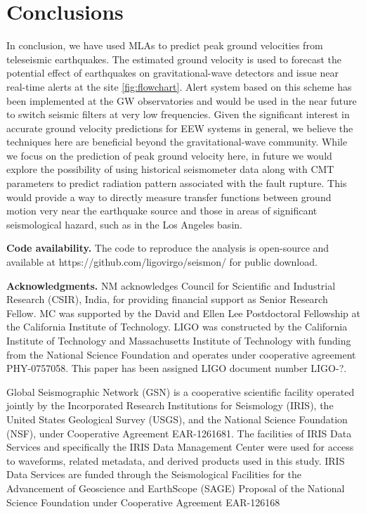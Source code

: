 \documentclass[twocolumn, aps, superscriptaddress]{revtex4}
\begin{document}
\section{Conclusions}
\label{sec:conclusion}
In conclusion, we have used MLAs to predict peak ground velocities from teleseismic earthquakes. The estimated ground velocity is used to forecast the potential effect of earthquakes on gravitational-wave detectors and issue near real-time alerts at the site \ref{fig:flowchart}. Alert system based on this scheme has been implemented at the GW observatories and would be used in the near future to switch seismic filters at very low frequencies. Given the significant interest in accurate ground velocity predictions for EEW systems in general, we believe the techniques here are beneficial beyond the gravitational-wave community.
While we focus on the prediction of peak ground velocity here, in future we would explore the possibility of using historical seismometer data along with CMT parameters to predict radiation pattern associated with the fault rupture.
This would provide a way to directly measure transfer functions between ground motion very near the earthquake source and those in areas of significant seismological hazard, such as in the Los Angeles basin.


\textbf{Code availability.}
The code to reproduce the analysis is open-source and available at https://github.com/ligovirgo/seismon/ for public download.

\textbf{Acknowledgments.}
NM acknowledges Council for Scientific and Industrial Research (CSIR), India, for providing financial support as Senior Research Fellow.  MC was supported by the David and Ellen Lee Postdoctoral Fellowship at the California Institute of Technology. LIGO was constructed by the California Institute of Technology and Massachusetts Institute of Technology with funding from the National Science Foundation and operates under cooperative agreement PHY-0757058.
This paper has been assigned LIGO document number LIGO-?.

Global Seismographic Network (GSN) is a cooperative scientific facility operated jointly by the Incorporated Research Institutions for Seismology (IRIS), the United States Geological Survey (USGS), and the National Science Foundation (NSF), under Cooperative Agreement EAR-1261681.
The facilities of IRIS Data Services and specifically the IRIS Data Management Center were used for access to waveforms, related metadata, and derived products used in this study. IRIS Data Services are funded through the Seismological Facilities for the Advancement of Geoscience and EarthScope (SAGE) Proposal of the National Science Foundation under Cooperative Agreement EAR-126168



\end{document}
